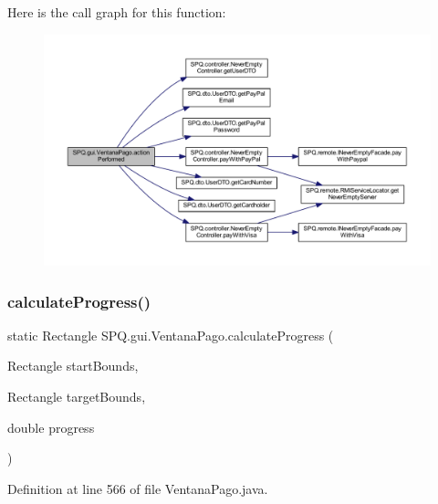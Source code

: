 Here is the call graph for this function\+:\nopagebreak
\begin{figure}[H]
\begin{center}
\leavevmode
\includegraphics[width=350pt]{class_s_p_q_1_1gui_1_1_ventana_pago_a64947ae1b81ff8e561792d9db382b1f9_cgraph}
\end{center}
\end{figure}
\mbox{\label{class_s_p_q_1_1gui_1_1_ventana_pago_ab3583b9bfd461ce0bede2df8ea8c7bd1}} 
\subsubsection{\texorpdfstring{calculate\+Progress()}{calculateProgress()}\hspace{0.1cm}{\footnotesize\ttfamily [1/4]}}
{\footnotesize\ttfamily static Rectangle S\+P\+Q.\+gui.\+Ventana\+Pago.\+calculate\+Progress (\begin{DoxyParamCaption}\item[{Rectangle}]{start\+Bounds,  }\item[{Rectangle}]{target\+Bounds,  }\item[{double}]{progress }\end{DoxyParamCaption})\hspace{0.3cm}{\ttfamily [static]}}



Definition at line 566 of file Ventana\+Pago.\+java.


